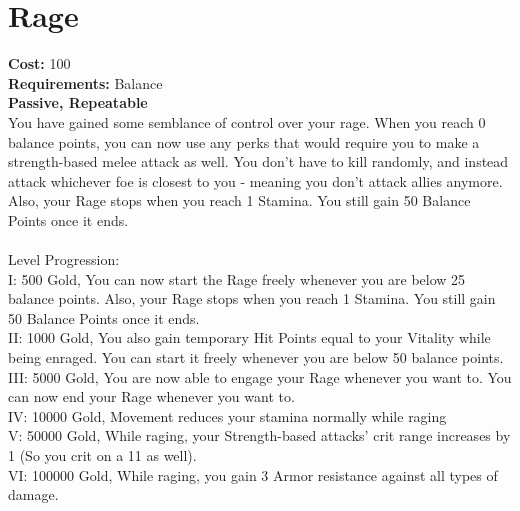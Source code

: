 \section{Rage}
\textbf{Cost:} 100\\
\textbf{Requirements:} Balance\\
\textbf{Passive, Repeatable}\\
You have gained some semblance of control over your rage. When you reach 0 balance points, you can now use any perks that would require you to make a strength-based melee attack as well. You don't have to kill randomly, and instead attack whichever foe is closest to you - meaning you don't attack allies anymore. Also, your Rage stops when you reach 1 Stamina. You still gain 50 Balance Points once it ends.\\
\\
Level Progression:\\
I: 500 Gold, You can now start the Rage freely whenever you are below 25 balance points. Also, your Rage stops when you reach 1 Stamina. You still gain 50 Balance Points once it ends.\\
II: 1000 Gold, You also gain temporary Hit Points equal to your Vitality while being enraged. You can start it freely whenever you are below 50 balance points.\\
III: 5000 Gold, You are now able to engage your Rage whenever you want to. You can now end your Rage whenever you want to.\\
IV: 10000 Gold, Movement reduces your stamina normally while raging\\
V: 50000 Gold, While raging, your Strength-based attacks' crit range increases by 1 (So you crit on a 11 as well).\\
VI: 100000 Gold, While raging, you gain 3 Armor resistance against all types of damage.
